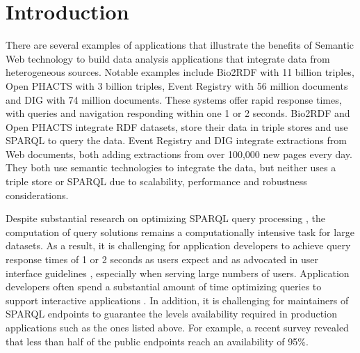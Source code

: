 \section{Introduction}
There are several examples of applications that illustrate the benefits of Semantic Web technology to build data analysis applications that integrate data from heterogeneous sources.
Notable examples include Bio2RDF \cite{callahan2013bio2rdf} with 11 billion triples, Open PHACTS \cite{Groth_Loizou_Gray_Goble_Harland_Pettifer_2014} with 3 billion triples, Event Registry \cite{Leban_Fortuna_Brank_Grobelnik_2014} with 56 million documents and DIG \cite{szekely2015building} with 74 million documents.
These systems offer rapid response times, with queries and navigation responding within one 1 or 2 seconds.
Bio2RDF and Open PHACTS integrate RDF datasets, store their data in triple stores and use SPARQL to query the data.
Event Registry and DIG integrate extractions from Web documents, both adding extractions from over 100,000 new pages every day.
They both use semantic technologies to integrate the data, but neither uses a triple store or SPARQL due to scalability, performance and robustness considerations.

Despite substantial research on optimizing SPARQL query processing \cite{Pham2013}, the computation of query solutions remains a computationally intensive task for large datasets.
As a result, it is challenging for application developers to achieve query response times of 1 or 2 seconds as users expect and as advocated in user interface guidelines \cite{nielsen1994usability}, especially when serving large numbers of users.
Application developers often spend a substantial amount of time optimizing queries to support interactive applications \cite{Loizou_Angles_Groth_2014}.
In addition, it is challenging for maintainers of SPARQL endpoints to guarantee the levels availability required in production applications such as the ones listed above.
For example, a recent survey \cite{buil2013sparql} revealed that less than half of the public endpoints reach an availability of 95\%.

